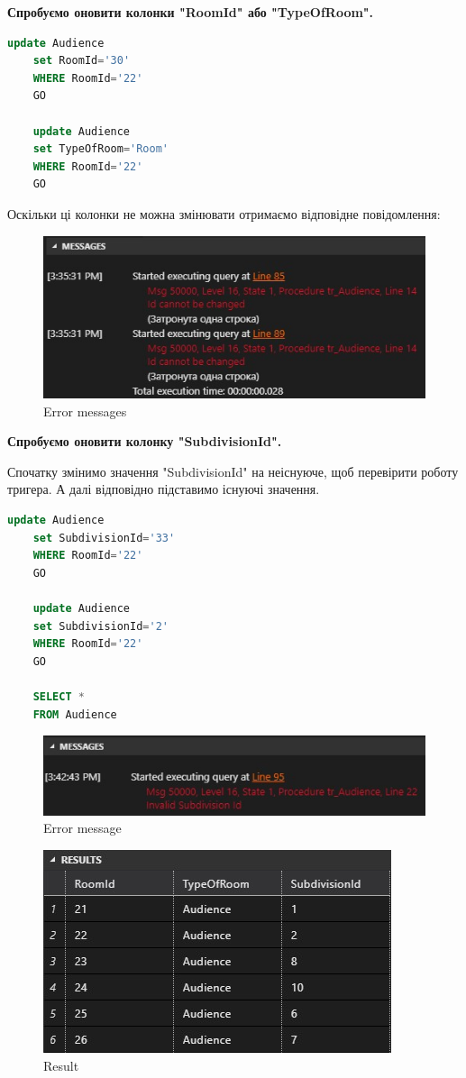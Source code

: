 \documentclass[a4paper,12pt]{article}
\begin{document}
\newpage
	\begin{center}
		\textbf{Спробуємо оновити колонки "RoomId" або "TypeOfRoom".}
	\end{center}
	\begin{lstlisting}[language=SQL]
	update Audience
	set RoomId='30'
	WHERE RoomId='22'
	GO
	
	update Audience
	set TypeOfRoom='Room'
	WHERE RoomId='22'
	GO
	\end{lstlisting}
	Оскільки ці колонки не можна змінювати отримаємо відповідне повідомлення:
	\begin{figure}[h!]
		\begin{minipage}[h]{1\linewidth}
			\centering
			\includegraphics[width=0.6\linewidth]{Prt sc/Figure_3.jpg}  
		\end{minipage}
		\caption{Error messages}
	\end{figure}
	\begin{center}
		\textbf{Спробуємо оновити колонку "SubdivisionId".}
	\end{center}
	Спочатку змінимо значення "SubdivisionId" на неіснуюче, щоб перевірити роботу тригера. 
	А далі відповідно підставимо існуючі значення.
	\begin{lstlisting}[language=SQL]
	update Audience
	set SubdivisionId='33'
	WHERE RoomId='22'
	GO
	
	update Audience
	set SubdivisionId='2'
	WHERE RoomId='22'
	GO
	
	SELECT *
	FROM Audience
	\end{lstlisting}
	\begin{figure}[h!]
		\begin{minipage}[h]{1\linewidth}
			\centering
			\includegraphics[width=0.6\linewidth]{Prt sc/Figure_4.jpg}  
		\end{minipage}
		\caption{Error message}
	\end{figure}

\newpage
	\begin{figure}[h!]
		\begin{minipage}[h]{1\linewidth}
			\centering
			\includegraphics[width=0.6\linewidth]{Prt sc/Figure_5.jpg}  
		\end{minipage}
		\caption{Result}
	\end{figure}
\end{document}
